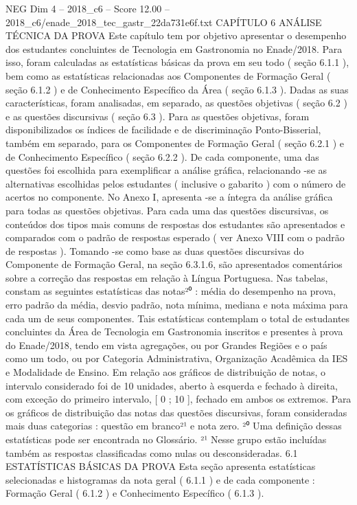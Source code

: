 \begin{textsample}{NEG Dim 4 – 2018\_c6 – Score 12.00 – 2018\_c6/enade\_2018\_tec\_gastr\_22da731e6f.txt}  \label{ex:f4_neg_346}
CAPÍTULO 6 ANÁLISE TÉCNICA DA PROVA Este capítulo tem por objetivo apresentar o desempenho dos estudantes concluintes de Tecnologia em Gastronomia no Enade/2018.
Para isso, foram calculadas as estatísticas básicas da prova em seu todo ( seção 6.1.1 ), bem como as estatísticas relacionadas aos Componentes de Formação Geral ( seção 6.1.2 ) e de Conhecimento Específico da Área ( seção 6.1.3 ).
Dadas as suas características, foram analisadas, em separado, as questões objetivas ( seção 6.2 ) e as questões discursivas ( seção 6.3 ).
Para as questões objetivas, foram disponibilizados os índices de facilidade e de discriminação Ponto-Bisserial, também em separado, para os Componentes de Formação Geral ( seção 6.2.1 ) e de Conhecimento Específico ( seção 6.2.2 ).
De cada componente, uma das questões foi escolhida para exemplificar a análise gráfica, relacionando -se as alternativas escolhidas pelos estudantes ( inclusive o gabarito ) com o número de acertos no componente.
No Anexo I, apresenta -se a íntegra da análise gráfica para todas as questões objetivas.
Para cada uma das questões discursivas, os conteúdos dos tipos mais comuns de respostas dos estudantes são apresentados e comparados com o padrão de respostas esperado ( ver Anexo VIII com o padrão de respostas ).
Tomando -se como base as duas questões discursivas do Componente de Formação Geral, na seção 6.3.1.6, são apresentados comentários sobre a correção das respostas em relação à Língua Portuguesa.
Nas tabelas, constam as seguintes estatísticas das notas²⁰ : média do desempenho na prova, erro padrão da média, desvio padrão, nota mínima, mediana e nota máxima para cada um de seus componentes.
Tais estatísticas contemplam o total de estudantes concluintes da Área de Tecnologia em Gastronomia inscritos e presentes à prova do Enade/2018, tendo em vista agregações, ou por Grandes Regiões e o país como um todo, ou por Categoria Administrativa, Organização Acadêmica da IES e Modalidade de Ensino.
Em relação aos gráficos de distribuição de notas, o intervalo considerado foi de 10 unidades, aberto à esquerda e fechado à direita, com exceção do primeiro intervalo, [ 0 ; 10 ], fechado em ambos os extremos.
Para os gráficos de distribuição das notas das questões discursivas, foram consideradas mais duas categorias : questão em branco²¹ e nota zero. ²⁰ Uma definição dessas estatísticas pode ser encontrada no Glossário. ²¹ Nesse grupo estão incluídas também as respostas classificadas como nulas ou desconsideradas. 6.1 ESTATÍSTICAS BÁSICAS DA PROVA Esta seção apresenta estatísticas selecionadas e histogramas da nota geral ( 6.1.1 ) e de cada componente : Formação Geral ( 6.1.2 ) e Conhecimento Específico ( 6.1.3 ).

\end{textsample}
